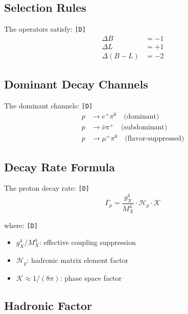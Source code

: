 \documentclass[11pt,a4paper]{article}
\newcommand{\tagD}{\textcolor{green!50!black}{\texttt{[D]}}}
\theoremstyle{definition}
\begin{document}
\subsection{Selection Rules}
\label{subsec:selection-rules}

The operators satisfy: \tagD{}
\begin{align}
\label{eq:delta-b}
\Delta B &= -1 \\
\label{eq:delta-l}
\Delta L &= +1 \\
\label{eq:delta-bl}
\Delta(B - L) &= -2
\end{align}

\subsection{Dominant Decay Channels}
\label{subsec:decay-channels}

The dominant channels: \tagD{}
\begin{align}
\label{eq:ch-epi0}
p &\to e^+ \pi^0 \quad \text{(dominant)} \\
\label{eq:ch-nupi}
p &\to \bar{\nu} \pi^+ \quad \text{(subdominant)} \\
\label{eq:ch-mupi0}
p &\to \mu^+ \pi^0 \quad \text{(flavor-suppressed)}
\end{align}

\subsection{Decay Rate Formula}
\label{subsec:decay-rate}

The proton decay rate: \tagD{}
\begin{equation}
\label{eq:decay-rate}
\Gamma_p = \frac{g_X^4}{M_X^4} \cdot \mathcal{H}_p \cdot \mathcal{K}
\end{equation}

where: \tagD{}
\begin{itemize}
  \item $g_X^4/M_X^4$: effective coupling suppression
  \item $\mathcal{H}_p$: hadronic matrix element factor
  \item $\mathcal{K} \approx 1/(8\pi)$: phase space factor
\end{itemize}

\subsection{Hadronic Factor}
\label{subsec:hadronic-factor}
\end{document}
